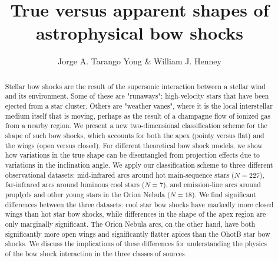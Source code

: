 \documentclass[useAMS, usenatbib, a4paper]{mnras}
\title[Bowshock shapes]{True versus apparent shapes of astrophysical bow shocks}
\author[Tarango Yong \& Henney]{
  Jorge A. Tarango Yong \& William J. Henney\\
  \AddressCRyA
}
\newcommand\hii{\ion{H}{ii}}
\begin{document}
\maketitle
\begin{abstract}
  Stellar bow shocks are the result of the supersonic interaction
  between a stellar wind and its environment.  Some of these are
  "runaways": high-velocity stars that have been ejected from a star
  cluster.  Others are "weather vanes", where it is the local
  interstellar medium itself that is moving, perhaps as the result of
  a champagne flow of ionized gas from a nearby \hii{} region.  We
  present a new two-dimensional classification scheme for the shape of
  such bow shocks, which accounts for both the apex (pointy versus
  flat) and the wings (open versus closed).  For different theoretical
  bow shock models, we show how variations in the true shape can be
  disentangled from projection effects due to variations in the
  inclination angle.  We apply our classification scheme to three
  different observational datasets: mid-infrared arcs around hot
  main-sequence stars (\(N = 227\)), far-infrared arcs around luminous
  cool stars (\(N = 7\)), and emission-line arcs around proplyds and other
  young stars in the Orion Nebula (\(N = 18\)).  We find significant
  differences between the three datasets: cool star bow shocks have
  markedly more closed wings than hot star bow shocks, while
  differences in the shape of the apex region are only marginally
  significant.  The Orion Nebula arcs, on the other hand, have both
  significantly more open wings and significantly flatter apices than
  the OhotB star bow shocks.  We discuss the implications of these
  differences for understanding the physics of the bow shock
  interaction in the three classes of sources.
\end{abstract}






\clearpage




\clearpage

\end{document}
